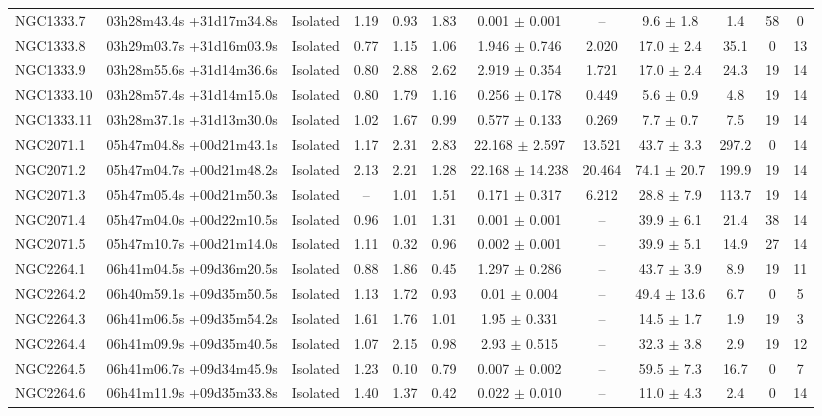 \begin{landscape}
\begin{longtable}{lccccccccccc}
NGC1333.7	&	03h28m43.4s +31d17m34.8s	&	Isolated	&	1.19	&	0.93	&	1.83	&	0.001	$\pm$	0.001	&	--	&	9.6	$\pm$	1.8	&	1.4	&	58	&	0	\\
NGC1333.8	&	03h29m03.7s +31d16m03.9s	&	Isolated	&	0.77	&	1.15	&	1.06	&	1.946	$\pm$	0.746	&	2.020	&	17.0	$\pm$	2.4	&	35.1	&	0	&	13	\\
NGC1333.9	&	03h28m55.6s +31d14m36.6s	&	Isolated	&	0.80	&	2.88	&	2.62	&	2.919	$\pm$	0.354	&	1.721	&	17.0	$\pm$	2.4	&	24.3	&	19	&	14	\\
NGC1333.10	&	03h28m57.4s +31d14m15.0s	&	Isolated	&	0.80	&	1.79	&	1.16	&	0.256	$\pm$	0.178	&	0.449	&	5.6	$\pm$	0.9	&	4.8	&	19	&	14	\\
NGC1333.11	&	03h28m37.1s +31d13m30.0s	&	Isolated	&	1.02	&	1.67	&	0.99	&	0.577	$\pm$	0.133	&	0.269	&	7.7	$\pm$	0.7	&	7.5	&	19	&	14	\\
NGC2071.1	&	05h47m04.8s +00d21m43.1s	&	Isolated	&	1.17	&	2.31	&	2.83	&	22.168	$\pm$	2.597	&	13.521	&	43.7	$\pm$	3.3	&	297.2	&	0	&	14	\\
NGC2071.2	&	05h47m04.7s +00d21m48.2s	&	Isolated	&	2.13	&	2.21	&	1.28	&	22.168	$\pm$	14.238	&	20.464	&	74.1	$\pm$	20.7	&	199.9	&	19	&	14	\\
NGC2071.3	&	05h47m05.4s +00d21m50.3s	&	Isolated	&	--	&	1.01	&	1.51	&	0.171	$\pm$	0.317	&	6.212	&	28.8	$\pm$	7.9	&	113.7	&	19	&	14	\\
NGC2071.4	&	05h47m04.0s +00d22m10.5s	&	Isolated	&	0.96	&	1.01	&	1.31	&	0.001	$\pm$	0.001	&	--	&	39.9	$\pm$	6.1	&	21.4	&	38	&	14	\\
NGC2071.5	&	05h47m10.7s +00d21m14.0s	&	Isolated	&	1.11	&	0.32	&	0.96	&	0.002	$\pm$	0.001	&	--	&	39.9	$\pm$	5.1	&	14.9	&	27	&	14	\\
NGC2264.1	&	06h41m04.5s +09d36m20.5s	&	Isolated	&	0.88	&	1.86	&	0.45	&	1.297	$\pm$	0.286	&	--	&	43.7	$\pm$	3.9	&	8.9	&	19	&	11	\\
NGC2264.2	&	06h40m59.1s +09d35m50.5s	&	Isolated	&	1.13	&	1.72	&	0.93	&	0.01	$\pm$	0.004	&	--	&	49.4	$\pm$	13.6	&	6.7	&	0	&	5	\\
NGC2264.3	&	06h41m06.5s +09d35m54.2s	&	Isolated	&	1.61	&	1.76	&	1.01	&	1.95	$\pm$	0.331	&	--	&	14.5	$\pm$	1.7	&	1.9	&	19	&	3	\\
NGC2264.4	&	06h41m09.9s +09d35m40.5s	&	Isolated	&	1.07	&	2.15	&	0.98	&	2.93	$\pm$	0.515	&	--	&	32.3	$\pm$	3.8	&	2.9	&	19	&	12	\\
NGC2264.5	&	06h41m06.7s +09d34m45.9s	&	Isolated	&	1.23	&	0.10	&	0.79	&	0.007	$\pm$	0.002	&	--	&	59.5	$\pm$	7.3	&	16.7	&	0	&	7	\\
NGC2264.6	&	06h41m11.9s +09d35m33.8s	&	Isolated	&	1.40	&	1.37	&	0.42	&	0.022	$\pm$	0.010	&	--	&	11.0	$\pm$	4.3	&	2.4	&	0	&	14	\\

\end{longtable}
\end{landscape}
